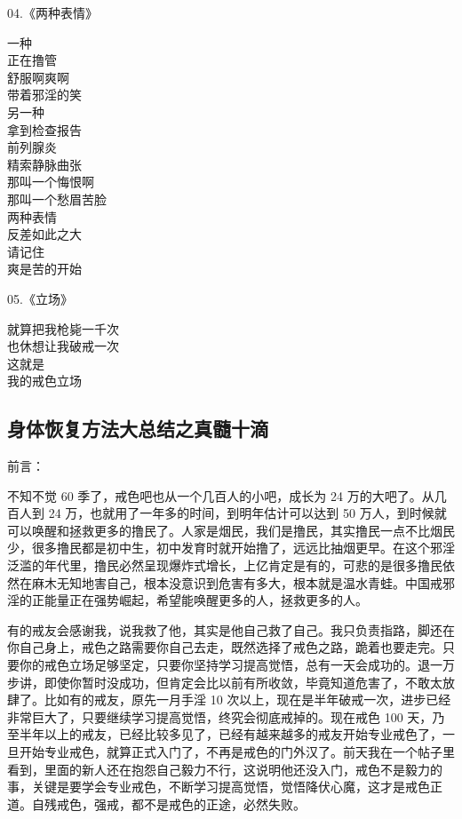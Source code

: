 \begin{multicols}{2}
    \begin{center}
        04.《两种表情》\it

        一种 \\ 正在撸管 \\ 舒服啊爽啊 \\ 带着邪淫的笑
        ~\\
        另一种 \\ 拿到检查报告 \\ 前列腺炎 \\ 精索静脉曲张 \\ 那叫一个悔恨啊 \\ 那叫一个愁眉苦脸
        ~\\
        两种表情 \\ 反差如此之大 \\ 请记住 \\ 爽是苦的开始
    \end{center}

    \begin{center}
        05.《立场》\it

        就算把我枪毙一千次 \\ 也休想让我破戒一次 \\ 这就是 \\ 我的戒色立场
    \end{center}
\end{multicols}

\subsection{身体恢复方法大总结之真髓十滴}

前言：

不知不觉 60 季了，戒色吧也从一个几百人的小吧，成长为 24 万的大吧了。从几百人到 24 万，也就用了一年多的时间，到明年估计可以达到 50 万人，到时候就可以唤醒和拯救更多的撸民了。人家是烟民，我们是撸民，其实撸民一点不比烟民少，很多撸民都是初中生，初中发育时就开始撸了，远远比抽烟更早。在这个邪淫泛滥的年代里，撸民必然呈现爆炸式增长，上亿肯定是有的，可悲的是很多撸民依然在麻木无知地害自己，根本没意识到危害有多大，根本就是温水青蛙。中国戒邪淫的正能量正在强势崛起，希望能唤醒更多的人，拯救更多的人。

有的戒友会感谢我，说我救了他，其实是他自己救了自己。我只负责指路，脚还在你自己身上，戒色之路需要你自己去走，既然选择了戒色之路，跪着也要走完。只要你的戒色立场足够坚定，只要你坚持学习提高觉悟，总有一天会成功的。退一万步讲，即使你暂时没成功，但肯定会比以前有所收敛，毕竟知道危害了，不敢太放肆了。比如有的戒友，原先一月手淫 10 次以上，现在是半年破戒一次，进步已经非常巨大了，只要继续学习提高觉悟，终究会彻底戒掉的。现在戒色 100 天，乃至半年以上的戒友，已经比较多见了，已经有越来越多的戒友开始专业戒色了，一旦开始专业戒色，就算正式入门了，不再是戒色的门外汉了。前天我在一个帖子里看到，里面的新人还在抱怨自己毅力不行，这说明他还没入门，戒色不是毅力的事，关键是要学会专业戒色，不断学习提高觉悟，觉悟降伏心魔，这才是戒色正道。自残戒色，强戒，都不是戒色的正途，必然失败。


